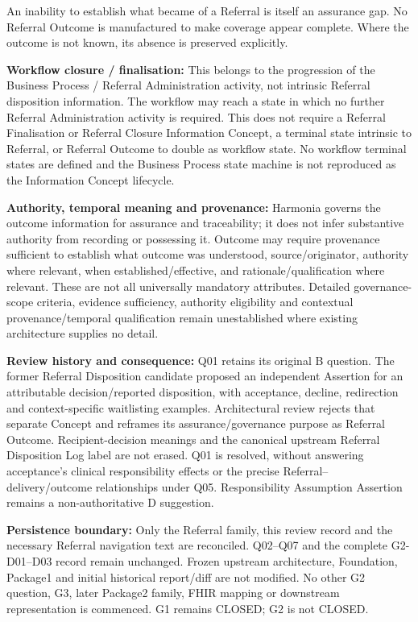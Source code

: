 An inability to establish what became of a Referral is itself an assurance gap. No Referral Outcome is manufactured to make coverage appear complete. Where the outcome is not known, its absence is preserved explicitly.



\textbf{Workflow closure / finalisation:} This belongs to the progression of the Business Process / Referral Administration activity, not intrinsic Referral disposition information. The workflow may reach a state in which no further Referral Administration activity is required. This does not require a Referral Finalisation or Referral Closure Information Concept, a terminal state intrinsic to Referral, or Referral Outcome to double as workflow state. No workflow terminal states are defined and the Business Process state machine is not reproduced as the Information Concept lifecycle.



\textbf{Authority, temporal meaning and provenance:} Harmonia governs the outcome information for assurance and traceability; it does not infer substantive authority from recording or possessing it. Outcome may require provenance sufficient to establish what outcome was understood, source/originator, authority where relevant, when established/effective, and rationale/qualification where relevant. These are not all universally mandatory attributes. Detailed governance-scope criteria, evidence sufficiency, authority eligibility and contextual provenance/temporal qualification remain unestablished where existing architecture supplies no detail.



\textbf{Review history and consequence:} Q01 retains its original B question. The former Referral Disposition candidate proposed an independent Assertion for an attributable decision/reported disposition, with acceptance, decline, redirection and context-specific waitlisting examples. Architectural review rejects that separate Concept and reframes its assurance/governance purpose as Referral Outcome. Recipient-decision meanings and the canonical upstream Referral Disposition Log label are not erased. Q01 is resolved, without answering acceptance's clinical responsibility effects or the precise Referral–delivery/outcome relationships under Q05. Responsibility Assumption Assertion remains a non-authoritative D suggestion.



\textbf{Persistence boundary:} Only the Referral family, this review record and the necessary Referral navigation text are reconciled. Q02–Q07 and the complete G2-D01–D03 record remain unchanged. Frozen upstream architecture, Foundation, Package1 and initial historical report/diff are not modified. No other G2 question, G3, later Package2 family, FHIR mapping or downstream representation is commenced. G1 remains CLOSED; G2 is not CLOSED.




